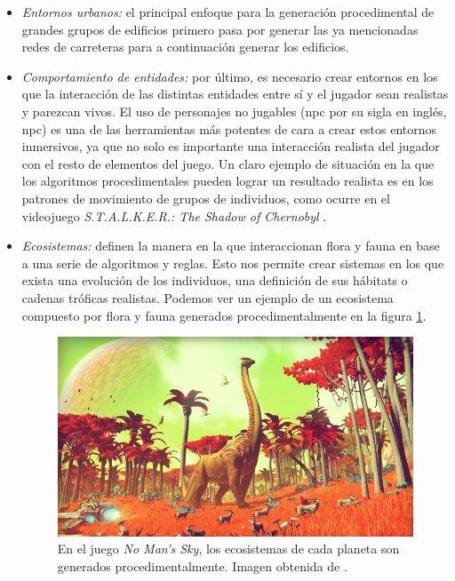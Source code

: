 \begin{enumerate}[label=(\alph*)]
    \begin{itemize}
        \item \textit{Entornos urbanos:} el principal enfoque para la generación procedimental de grandes grupos de edificios primero pasa por generar las ya mencionadas redes de carreteras para a continuación generar los edificios.
        \item \textit{Comportamiento de entidades:} por último, es necesario crear entornos en los que la interacción de las distintas entidades entre sí y el jugador sean realistas y parezcan vivos. El uso de personajes no jugables (\acrshort{npc} por su sigla en inglés, \acrlong{npc}) es una de las herramientas más potentes de cara a crear estos entornos inmersivos, ya que no solo es importante una interacción realista del jugador con el resto de elementos del juego. Un claro ejemplo de situación en la que los algoritmos procedimentales pueden lograr un resultado realista es en los patrones de movimiento de grupos de individuos, como ocurre en el videojuego \textit{ S.T.A.L.K.E.R.: The Shadow of Chernobyl} \cite{amato2017}.
        \item \textit{Ecosistemas:} definen la manera en la que interaccionan flora y fauna en base a una serie de algoritmos y reglas. Esto nos permite crear sistemas en los que exista una evolución de los individuos, una definición de sus hábitats o cadenas tróficas realistas. Podemos ver un ejemplo de un ecosistema compuesto por flora y fauna generados procedimentalmente en la figura \ref{fig:noman}.
        
        \begin{figure}[H]
            \begin{center}
                \includegraphics[scale=0.4]{img/no-mans-sky.jpg}
                \caption{En el juego \textit{No Man's Sky}, los ecosistemas de cada planeta son generados procedimentalmente. Imagen obtenida de \cite{grendel-games}.}
                \label{fig:noman}
            \end{center}
        \end{figure}    
        

\end{itemize}
\end{enumerate}
